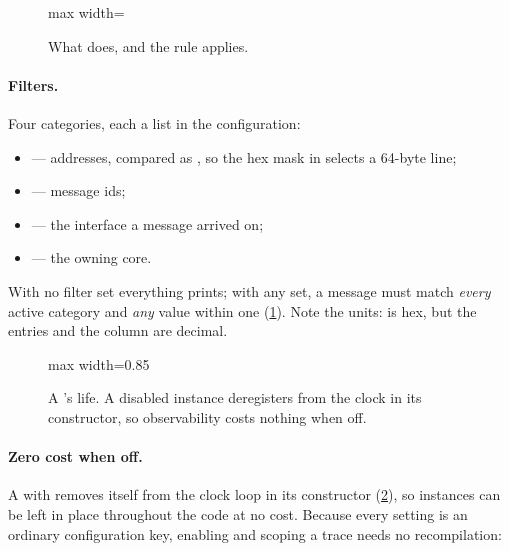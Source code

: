\begin{figure}[htbp]\centering
\begin{adjustbox}{max width=\textwidth}\end{adjustbox}
\caption{What  does, and the rule  applies.}
\label{fig:debugger-filter}
\end{figure}

\paragraph{Filters.} Four categories, each a list in the configuration:
\begin{itemize}
\item {} --- addresses, compared as , so the
  hex mask  in  selects a 64-byte line;
\item {} --- message ids;
\item {} --- the interface a message arrived on;
\item {} --- the owning core.
\end{itemize}
With no filter set everything prints; with any set, a message must match \emph{every} active
category and \emph{any} value within one (\cref{fig:debugger-filter}). Note the units:
 is hex, but the  entries and the  column are
decimal.

\begin{figure}[htbp]\centering
\begin{adjustbox}{max width=0.85\textwidth}\end{adjustbox}
\caption{A 's life. A disabled instance deregisters from the clock in its
constructor, so observability costs nothing when off.}
\label{fig:debugger-lifecycle}
\end{figure}

\paragraph{Zero cost when off.} A  with  removes itself
from the clock loop in its constructor (\cref{fig:debugger-lifecycle}), so instances can be
left in place throughout the code at no cost. Because every setting is an ordinary
configuration key, enabling and scoping a trace needs no recompilation:

